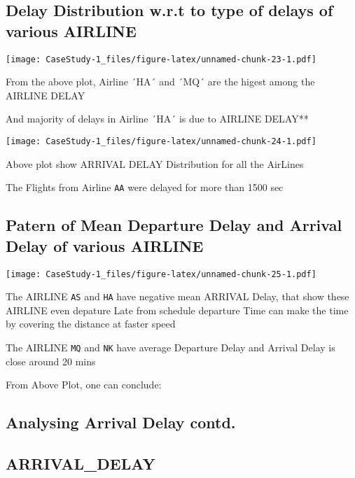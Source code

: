 \documentclass[]{article}
\begin{document}
\hypertarget{delay-distribution-w.r.t-to-type-of-delays-of-various-airline}{%
\subsection{Delay Distribution w.r.t to type of delays of various
AIRLINE}\label{delay-distribution-w.r.t-to-type-of-delays-of-various-airline}}

\texttt{[image: CaseStudy-1\_files/figure-latex/unnamed-chunk-23-1.pdf]}

From the above plot, Airline ´HA´ and ´MQ´ are the higest among the
AIRLINE DELAY

And majority of delays in Airline ´HA´ is due to AIRLINE DELAY**

\texttt{[image: CaseStudy-1\_files/figure-latex/unnamed-chunk-24-1.pdf]}

Above plot show ARRIVAL DELAY Distribution for all the AirLines

The Flights from Airline \texttt{AA} were delayed for more than 1500 sec

\hypertarget{patern-of-mean-departure-delay-and-arrival-delay-of-various-airline}{%
\subsection{Patern of Mean Departure Delay and Arrival Delay of various
AIRLINE}\label{patern-of-mean-departure-delay-and-arrival-delay-of-various-airline}}

\texttt{[image: CaseStudy-1\_files/figure-latex/unnamed-chunk-25-1.pdf]}

The AIRLINE \texttt{AS} and \texttt{HA} have negative mean ARRIVAL
Delay, that show these AIRLINE even depature Late from schedule
departure Time can make the time by covering the distance at faster
speed

The AIRLINE \texttt{MQ} and \texttt{NK} have average Departure Delay and
Arrival Delay is close around 20 mins

From Above Plot, one can conclude:

\hypertarget{analysing-arrival-delay-contd.}{%
\subsection{Analysing Arrival Delay
contd.}\label{analysing-arrival-delay-contd.}}

\hypertarget{arrival_delay}{%
\subsection{ARRIVAL\_DELAY}\label{arrival_delay}}
\end{document}
